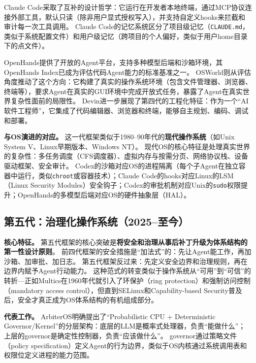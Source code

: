 Claude Code\cite{anthropic_claudecode_overview_2026}采取了互补的设计哲学：它运行在开发者本地终端，通过MCP协议\cite{mcp_intro_2026}连接外部工具，默认只读（除非用户显式授权写入），并支持自定义hooks来拦截和审计每一次工具调用\cite{anthropic_claudecode_security_2026}。
Claude Code的记忆系统\cite{anthropic_claudecode_memory_2026}区分了项目级记忆（\texttt{CLAUDE.md}，类似于系统配置文件）和用户级记忆（跨项目的个人偏好，类似于用户home目录下的点文件）。

OpenHands\cite{openhands_paper_2025}提供了开放的Agent平台，支持多种模型后端和沙箱环境，其OpenHands Index已成为评估代码Agent能力的标准基准之一。
OSWorld\cite{osworld2024}则从评估角度推动了这个方向：它构建了真实的操作系统环境（包含文件管理器、浏览器、终端等），要求Agent在真实的GUI环境中完成开放式任务，暴露了Agent在真实世界复杂性面前的局限性。
Devin\cite{devin2024cognition}进一步展现了第四代的工程化特征：作为一个``AI软件工程师''，它集成了代码编辑器、浏览器和终端，能够自主规划、编码、调试和部署。

\textbf{与OS演进的对应。}
这一代框架类似于1980--90年代的\textbf{现代操作系统}（如Unix System V、Linux早期版本、Windows NT）。
现代OS的核心特征是处理真实世界的复杂性：多任务调度（CFS调度器\cite{linux_cfs_2026}）、虚拟内存与按需分页、网络协议栈、设备驱动框架、安全审计。
Codex的沙箱对应OS的进程隔离（每个子Agent在独立容器中运行，类似\texttt{chroot}或容器技术）；Claude Code的hooks对应Linux的LSM（Linux Security Modules）安全钩子；Codex的审批机制对应Unix的\texttt{sudo}权限提升；OpenHands的多模型后端对应OS的硬件抽象层（HAL）。

\subsection*{第五代：治理化操作系统（2025--至今）}

\textbf{核心特征。}
第五代框架的核心突破是\textbf{将安全和治理从事后补丁升级为体系结构的第一性设计原则}。
前四代框架的安全措施是``加法式''的：先让Agent能工作，再加沙箱、加审批、加日志。
第五代框架反过来：先定义安全边界和治理规则，再在边界内赋予Agent行动能力。
这种范式的转变类似于操作系统从``可用''到``可信''的转折---正如Multics在1960年代就引入了环保护（ring protection）和强制访问控制（mandatory access control），但直到SELinux和Capability-based Security普及后，安全才真正成为OS体系结构的有机组成部分\cite{ostep_2023}。

\textbf{代表工作。}
ArbiterOS\cite{arbiteros2025}明确提出了``Probabilistic CPU + Deterministic Governor/Kernel''的分层架构：底层的LLM是概率式处理器，负责``能做什么''；上层的governor是确定性控制器，负责``应该做什么''。
governor通过策略文件（policy specification）定义Agent的行为边界，类似于OS内核通过系统调用表和权限位定义进程的能力范围。

